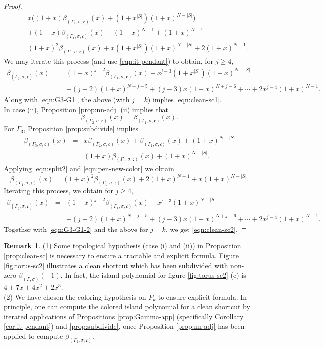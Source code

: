 \documentclass[10pt, reqno]{amsart}
\newcommand{\hf}{\hspace*{0.5cm}}
\theoremstyle{plain}
\theoremstyle{remark}
\theoremstyle{definition}
\newtheorem{rem}[theorem]{Remark}
\numberwithin{equation}{section}
\begin{document}
\begin{proof}
\begin{eqnarray*}
& = & x\big((1+x)\beta_{(\Gamma_1,\sigma,\mathfrak{c})}(x)+(1+x^{|S|})(1+x)^{N-|S|}\big)\\
&  & +(1+x)\beta_{(\Gamma_1,\sigma,\mathfrak{c})}(x)+(1+x)^{N-1}+(1+x)^{N-1}\\
& = & (1+x)^2\beta_{(\Gamma_1,\sigma,\mathfrak{c})}(x)+x(1+x^{|S|})(1+x)^{N-|S|}+2(1+x)^{N-1}.
\end{eqnarray*}
We may iterate this process (and use \eqref{eqn:it-pendant}) to obtain, for $j\geq 4$, 
\begin{eqnarray*}
\beta_{(\Gamma_j,\sigma,\mathfrak{c})}(x) & = & (1+x)^{j-2}\beta_{(\Gamma_1,\sigma,\mathfrak{c})}(x)+x^{j-3}(1+x^{|S|})(1+x)^{N-|S|}\\
&  & +(j-2)(1+x)^{N+j-5}+(j-3)x(1+x)^{N+j-6}+\cdots+2x^{j-4}(1+x)^{N-1}.
\end{eqnarray*}
Along with \eqref{eqn:G3-G1}, the above (with $j=k$) implies \eqref{eqn:clean-sc1}. \\
\hf In case (ii), Proposition \ref{prop:nn-adj} (ii) implies that 
$$\beta_{(\Gamma_2,\sigma,\mathfrak{c})}(x)=\beta_{(\Gamma_1,\sigma,\mathfrak{c})}(x).$$
For $\Gamma_3$, Proposition \ref{prop:subdivide} implies 
\begin{eqnarray}
\beta_{(\Gamma_3,\sigma,\mathfrak{c})}(x) & = & x\beta_{(\Gamma_2,\sigma,\mathfrak{c})}(x)+\beta_{(\Gamma_1,\sigma,\mathfrak{c})}(x)+(1+x)^{N-|S|}\nonumber \\
& = & (1+x)\beta_{(\Gamma_1,\sigma,\mathfrak{c})}(x)+(1+x)^{N-|S|}.\label{eqn:G3-G1-2}
\end{eqnarray}
Applying \eqref{eqn:split2} and \eqref{eqn:pen-new-color} we obtain
\begin{equation*}
\beta_{(\Gamma_4,\sigma,\mathfrak{c})}(x)=(1+x)^2\beta_{(\Gamma_1,\sigma,\mathfrak{c})}(x)+2(1+x)^{N-1}+x(1+x)^{N-|S|}.
\end{equation*}
Iterating this process, we obtain for $j\geq 4$,
\begin{eqnarray*}
\beta_{(\Gamma_j,\sigma,\mathfrak{c})}(x) & = & (1+x)^{j-2}\beta_{(\Gamma_1,\sigma,\mathfrak{c})}(x)+x^{j-3}(1+x)^{N-|S|}\\
&  & + (j-2)(1+x)^{N+j-5}+(j-3)x(1+x)^{N+j-6}+\cdots+2x^{j-4}(1+x)^{N-1}.  
\end{eqnarray*}
Together with \eqref{eqn:G3-G1-2} and the above for $j=k$, we get \eqref{eqn:clean-sc2}.
\end{proof}
\begin{rem}
(1) Some topological hypothesis (case (i) and (ii)) in Proposition \ref{prop:clean-sc} is necessary to ensure a tractable and explicit formula. Figure \ref{fig:torus-sc2} illustrates a clean shortcut which has been subdivided with non-zero $\beta_{(\Gamma,\sigma)}(-1)$. In fact, the island polynomial for figure \ref{fig:torus-sc2} (c) is $4+7x+4x^2+2x^3$.\\
(2) We have chosen the coloring hypothesis on $P_k$ to ensure explicit formula. In principle, one can compute the colored island polynomial for a clean shortcut by iterated applications of Propositions \ref{prop:Gamma-app} (specifically Corollary \ref{cor:it-pendant}) and \ref{prop:subdivide}, once Proposition \ref{prop:nn-adj} has been applied to compute $\beta_{(\Gamma_2,\sigma,\mathfrak{c})}$. 
\end{rem}
\end{document}

